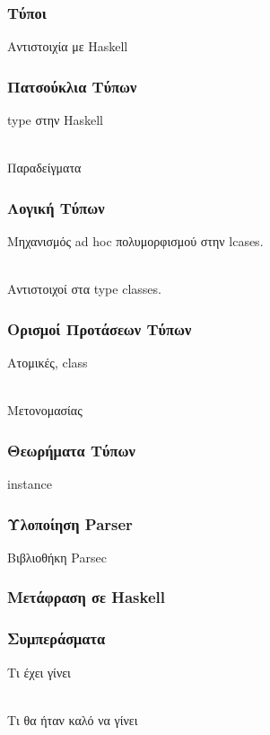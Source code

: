 \documentclass{beamer}
\def\e{\foreignlanguage{english}}
\def\h{\e{Haskell}}
\begin{document}
\begin{frame}

\frametitle{Τύποι}

Αντιστοιχία με \h

\end{frame}

\begin{frame}

\frametitle{Πατσούκλια Τύπων}

\e{type} στην \h
\\~\

Παραδείγματα

\end{frame}

\begin{frame}

\frametitle{Λογική Τύπων}

Μηχανισμός \e{ad hoc} πολυμορφισμού στην \e{lcases}.
\\~\

Αντιστοιχοί στα \e{type classes}.

\end{frame}

\begin{frame}

\frametitle{Ορισμοί Προτάσεων Τύπων}

Ατομικές, \e{class}
\\~\

Μετονομασίας

\end{frame}

\begin{frame}

\frametitle{Θεωρήματα Τύπων}

\e{instance}

\end{frame}

\begin{frame}

\frametitle{Υλοποίηση \e{Parser}}

Βιβλιοθήκη \e{Parsec}

\end{frame}

\begin{frame}

\frametitle{Μετάφραση σε \h}

\end{frame}

\begin{frame}

\frametitle{Συμπεράσματα}

Τι έχει γίνει
\\~\

Τι θα ήταν καλό να γίνει

\end{frame}
\end{document}
